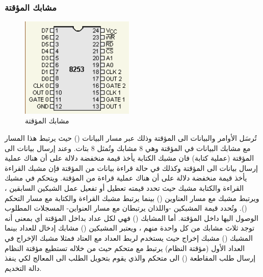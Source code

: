 \documentclass[document.tex]{subfiles}
\begin{document}
\subsubsection{مشابك المؤقتة }
\begin{figure}
\label{fig:pit_pins} 
  \vspace{-20pt}
  \begin{center}
    \includegraphics[width=0.48\textwidth]{../img/pit_pins}
  \end{center}
  \vspace{-20pt}
  \caption{مشابك المؤقتة }
  \vspace{-10pt}
\end{figure}
تُرسَل الأوامر والبيانات الى المؤقتة وذلك عبر مسار البيانات () حيث يرتبط هذا المسار مع مشابك البيانات في المؤقتة وهي 8 مشابك  وتُمثل 8 بتات. وعند إرسال بيانات الى المؤقتة (عملية كتابة) فان مشبك الكتابة  يأخذ قيمة منخفضة دلالة على أن هناك عملية إرسال بيانات الى المؤقتة وكذلك في حالة قراءة بيانات من المؤقتة فإن مشبك القراءة  يأخذ قيمة منخفضة دلالة على أن هناك عملية قراءة من المؤقتة. ويتحكم في مشبك القراءة والكتابة مشبك  حيث تحدد قيمته تعطيل أو تفعيل عمل الشبكين السابقين ، ويرتبط مشبك  مع مسار العناوين () بينما يرتبط مشبك القراءة والكتابة مع مسار التحكم (). وتُحدد قيمة المشبكين  -واللذان يرتبطان مع مسار العنواين- المسجلات المطلوب الوصول اليها داخل المؤقتة. أما المشابك () فهي لكل عداد بداخل المؤقتة أي بمعنى أنه توجد ثلاث مشابك من كل واحدة منهم ، ويعتبر المشبكين () مشابك إدخال للعداد بينما المشبك () مشبك إخراج حيث يستخدم لربط العداد مع العتاد فمثلا مشبك الإخراج في العداد الأول (مؤقتة النظام) يرتبط مع متحكم  حيث من خلاله تستطيع مؤقتة النظام إرسال طلب المقاطعة () الى متحكم  والذي يقوم بتحويل الطلب الى المعالج لكي ينفذ دالة التخديم.
\end{document}
